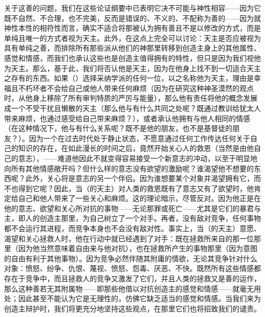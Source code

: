 关于这善的问题，我们在这些论证纲要中已表明它决不可能与神性相容——因为它既不自然、不合理，也不完美，反而是错误的、不义的、不配称为善的——因为就神性本性的相符性而言，确实不适合将那被认为拥有善且不是以修改的方式，而是单纯且唯一的方式者视为天主。此外，在这点上完全可以讨论：天主是否应被视为具有单纯之善，而排除所有那些派从他们的神那里转移到创造主身上的其他属性、感觉和情感，而我们也承认这些也是创造主值得拥有的特性，但只是因为我们视他为天主。那么，基于此，我们将否认他是天主，因为在他身上找不到一切适合天主之存有的东西。如果（）选择采纳学派的任何一位，以之名称他为天主，理由是幸福且不朽坏者不会给自己或他人带来任何麻烦（因为在研究这种神圣漠然的观点时，从他身上移除了所有审判特质的严厉与能量），那么他有责任将他的概念发展成一个不受干扰且懒散的天主（那么他与有什么共同之处呢？既通过教训给犹太人带来麻烦，也通过感受给自己带来麻烦？），或者承认他拥有与他人相同的情感（在这种情况下，他与有什么关系呢？既不是他的朋友，也不是基督徒的朋友？）。因为一个在过去时代处于静止状态，不愿意通过任何工作传达任何关于自己的知识的存在，在如此漫长的时间之后，竟然开始关心人的救恩（当然是由他自己的意志），——难道他因此不就变得容易接受一个新意志的冲动，以至于明显地向所有其他情感敞开吗？但什么样的意志没有欲望的激励呢？谁渴望他不想要的东西呢？此外，关心将是意志的另一个伴侣。因为谁想要某个对象并渴望拥有它，而不也得到它呢？因此，当（的天主）对人类的救恩既有了意志又有了欲望时，他肯定给自己和他人带来了一些关心和麻烦。这的理论暗示，尽管反对。因为他正是在他的意志、欲望和关心所对抗的事物——无论那罪或死亡——尤其是它们的暴君与主，即人的创造主那里，为自己树立了一个对手。再者，没有敌对竞争，任何事物都不会运行其进程，而竞争本身也不会没有敌对性。事实上，当（的天主）意愿、渴望和关心拯救人时，他在行动中就已经遇到了对手：既在拯救所来自的那一位那里（因为他当然意味着自由来与他对抗），也在拯救所产生的事物那里（因为意图的自由有利于其他事物）。因为竞争必然伴随其附庸的情欲，无论其竞争针对什么对象：愤怒、纷争、仇恨、蔑视、愤怒、怨毒、厌恶、不快。既然所有这些情感都存在于竞争中，而且拯救人的竞争又激发了它们，并且人类的拯救又是善的运作，那么这种善若无其附属物——即那些他借以对抗创造主的感觉和情感——就毫无用处；因此甚至不能认为它是无理性的，仿佛它缺乏适当的感觉和情感。当我们来为创造主辩护时，我们将更充分地坚持这些观点，在那里它们也将招致我们的谴责。\par


